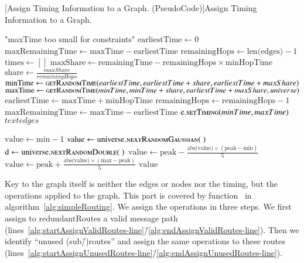\begin{breakablealgorithm}
	[Assign Timing Information to a Graph. (PseudoCode)]{Assign Timing Information to a Graph.}\label{alg:simpleTiming}
	\begin{algorithmic}[1]
		\label{alg:assignTiming-line}
		\Throw "maxTime too small for constraints"
		\EndIf
		\State $\text{earliestTime} \gets 0$
		\State $\text{maxRemainingTime} \gets \text{maxTime}-\text{earliestTime}$
		\State $\text{remainingHops} \gets \text{len(edges)} - 1$
		\State $\text{times} \gets []$
		\State $\text{maxShare} \gets \text{remainingTime} - \text{remainingHops}\times\text{minHopTime}$
		\State $\text{share} \gets \frac{maxShare}{remainingHops}$
		\State $\text{minTime} \gets \Call{getRandomTime}{earliestTime, earliestTime+share, earliestTime+maxShare}$\label{alg:minTime-line}
		\State $\text{maxTime} \gets \Call{getRandomTime}{minTime, minTime+share, earliestTime+maxShare, universe}$\label{alg:maxTime-line}
		\State $\text{earliestTime} \gets \text{maxTime}+\text{minHopTime}$
		\State $\text{remainingHops} \gets \text{remainingHops} - 1$
		\State $\text{maxRemainingTime} \gets \text{maxTime}-\text{earliestTime}$
		\State $\text{e}.\Call{setTiming}{minTime, maxTime}$
		\EndFor
		\Return $text{edges}$
		\EndFunction
		\item[]		
		\label{alg:getRandomTime-line}
		\State $\text{value} \gets \text{min}-1$
		\State $\text{value} \gets \text{universe}.\Call{nextRandomGaussian}{~}$
		\State $\text{d} \gets \text{universe}.\Call{nextRandomDouble}{~}$
		\State $\text{value} \gets \text{peak} - \frac{\text{abs(value)} \times (\text{peak} - \text{min})}{5}$
		\Else
		\State $\text{value} \gets \text{peak} + \frac{\text{abs(value)} \times (\text{max} - \text{peak})}{5}$
		\EndIf
		\EndWhile
		\Return $\text{value}$
		\EndFunction
	\end{algorithmic}
\end{breakablealgorithm}

Key to the graph itself is neither the edges or nodes nor the timing, but the operations applied to the graph. This part is covered by function~ in algorithm~\ref{alg:simpleRouting}. We assign the operations in three steps. We first assign to $\text{redundantRoutes}$ a valid message path (lines~\ref{alg:startAssignValidRoutes-line}\=/\ref{alg:endAssignValidRoutes-line}). Then we identify ``unused (sub\=/)routes'' and assign the same operations to these routes (lines~\ref{alg:startAssignUnusedRoutes-line}\=/\ref{alg:endAssignUnusedRoutes-line}). 

